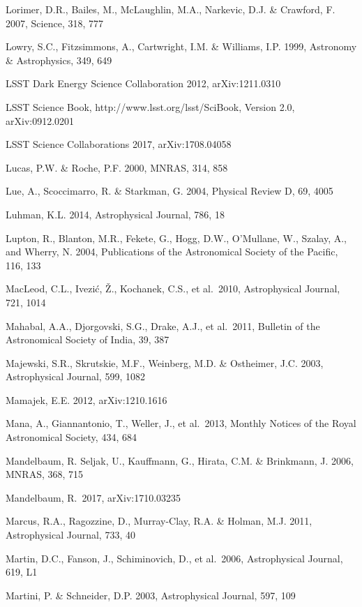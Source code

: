 \documentclass[twocolumn]{aastex61}
\begin{document}
\begin{thebibliography}{}
\bibitem[()]{} Lorimer, D.R., Bailes, M., McLaughlin, M.A., Narkevic, D.J. \& Crawford, F. 2007, Science, 318, 777

\bibitem[()]{} Lowry, S.C., Fitzsimmons, A., Cartwright, I.M. \& Williams, I.P. 1999, Astronomy \&
             Astrophysics, 349, 649

\bibitem[()]{} LSST Dark Energy Science Collaboration 2012, arXiv:1211.0310

\bibitem[()]{} LSST Science Book,
  http://www.lsst.org/lsst/SciBook,  Version 2.0, arXiv:0912.0201

\bibitem[()]{} LSST Science Collaborations 2017, arXiv:1708.04058

\bibitem[()]{} Lucas, P.W. \& Roche, P.F. 2000, MNRAS, 314, 858

\bibitem[()]{} Lue, A., Scoccimarro, R. \& Starkman, G. 2004, Physical Review D, 69, 4005

\bibitem[()]{} Luhman, K.L. 2014,  Astrophysical Journal, 786, 18

\bibitem[()]{} Lupton, R., Blanton, M.R., Fekete, G., Hogg, D.W.,
  O'Mullane, W., Szalay, A., and Wherry, N. 2004, Publications of the
  Astronomical Society of the Pacific, 116, 133

\bibitem[()]{} MacLeod, C.L., Ivezi\'{c}, \v{Z}., Kochanek, C.S., et al.~2010, Astrophysical Journal, 721, 1014

\bibitem[()]{} Mahabal, A.A., Djorgovski, S.G., Drake, A.J., et al.~2011, Bulletin of the Astronomical Society of India, 39, 387

\bibitem[()]{} Majewski, S.R., Skrutskie, M.F., Weinberg, M.D. \& Ostheimer, J.C. 2003,
             Astrophysical Journal, 599, 1082

\bibitem[()]{} Mamajek, E.E. 2012, arXiv:1210.1616

\bibitem[()]{} Mana, A., Giannantonio, T., Weller, J., et al.~2013, Monthly Notices of the Royal Astronomical Society, 434, 684

\bibitem[()]{} Mandelbaum, R. Seljak, U., Kauffmann, G., Hirata, C.M. \& Brinkmann, J. 2006, MNRAS, 368, 715

\bibitem[()]{} Mandelbaum, R.~2017, arXiv:1710.03235

\bibitem[()]{} Marcus, R.A., Ragozzine, D., Murray-Clay, R.A. \& Holman, M.J. 2011, Astrophysical Journal, 733, 40

 Martin, D.C., Fanson, J., Schiminovich, D., et al.~2006, Astrophysical Journal, 619, L1

\bibitem[()]{} Martini, P. \& Schneider, D.P. 2003, Astrophysical Journal, 597, 109


\end{thebibliography}
\end{document}
